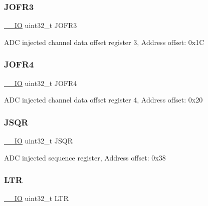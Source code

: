 \subsubsection{\texorpdfstring{J\+O\+F\+R3}{JOFR3}}
{\footnotesize\ttfamily \mbox{\hyperlink{core__sc300_8h_aec43007d9998a0a0e01faede4133d6be}{\+\_\+\+\_\+\+IO}} uint32\+\_\+t J\+O\+F\+R3}

A\+DC injected channel data offset register 3, Address offset\+: 0x1C \mbox{\label{struct_a_d_c___type_def_a2fd59854223e38158b4138ee8e913ab3}} 
\subsubsection{\texorpdfstring{J\+O\+F\+R4}{JOFR4}}
{\footnotesize\ttfamily \mbox{\hyperlink{core__sc300_8h_aec43007d9998a0a0e01faede4133d6be}{\+\_\+\+\_\+\+IO}} uint32\+\_\+t J\+O\+F\+R4}

A\+DC injected channel data offset register 4, Address offset\+: 0x20 \mbox{\label{struct_a_d_c___type_def_a75e0cc079831adcc051df456737d3ae4}} 
\subsubsection{\texorpdfstring{J\+S\+QR}{JSQR}}
{\footnotesize\ttfamily \mbox{\hyperlink{core__sc300_8h_aec43007d9998a0a0e01faede4133d6be}{\+\_\+\+\_\+\+IO}} uint32\+\_\+t J\+S\+QR}

A\+DC injected sequence register, Address offset\+: 0x38 \mbox{\label{struct_a_d_c___type_def_a9f8712dfef7125c0bb39db11f2b7416b}} 
\subsubsection{\texorpdfstring{L\+TR}{LTR}}
{\footnotesize\ttfamily \mbox{\hyperlink{core__sc300_8h_aec43007d9998a0a0e01faede4133d6be}{\+\_\+\+\_\+\+IO}} uint32\+\_\+t L\+TR}

